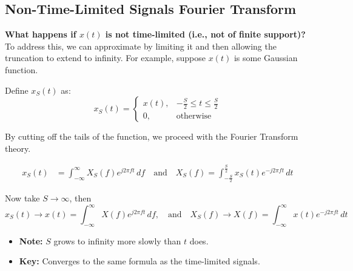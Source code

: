 \subsection{Non-Time-Limited Signals Fourier Transform}
\begin{derivation}
    \textbf{What happens if \( x(t) \) is not time-limited (i.e., not of finite support)?} To address this, we can approximate by limiting it and then allowing the truncation to extend to infinity. For example, suppose \( x(t) \) is some Gaussian function.

    Define \( x_S(t) \) as:
    \[
    x_S(t) = 
    \begin{cases}
        x(t), & -\frac{S}{2} \leq t \leq \frac{S}{2} \\
        0, & \text{otherwise}
    \end{cases}
    \]

    By cutting off the tails of the function, we proceed with the Fourier Transform theory.

    \begin{align*}
        x_S(t) &= \int_{-\infty}^{\infty} X_S(f) e^{j 2 \pi f t} \, df \quad \text{and} \quad X_S(f) = \int_{-\frac{S}{2}}^{\frac{S}{2}} x_S(t) e^{-j 2 \pi f t} \, dt 
    \end{align*}

    Now take $S \to \infty$, then
    \begin{equation*}
        x_S(t) \to x(t) = \int_{-\infty}^{\infty} X(f) e^{j 2 \pi f t} \, df, \quad \text{and} \quad X_S(f) \to X(f) = \int_{-\infty}^{\infty} x(t) e^{-j 2 \pi f t} \, dt
    \end{equation*}

    \begin{itemize}
        \item \textbf{Note:} \( S \) grows to infinity more slowly than \( t \) does.
        \item \textbf{Key:} Converges to the same formula as the time-limited signals.
    \end{itemize}
\end{derivation}


